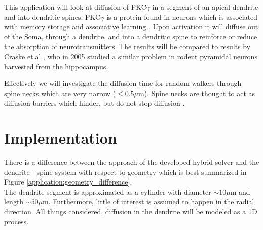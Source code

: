 \noindent This application will look at diffusion of PKC$\gamma$ in a segment of an apical dendrite and into dendritic spines. 
PKC$\gamma$ is a protein found in neurons which is associated with memory storage and associative learning \cite{saito2002protein}. 
Upon activation it will diffuse out of the Soma, through a dendrite, and into a dendritic spine to reinforce or reduce the absorption of neurotransmitters. 
The results will be compared to results by Craske et.al \cite{craske2005spines}, who in 2005 studied a similar problem in rodent pyramidal neurons harvested from the hippocampus.

Effectively we will investigate the diffusion time for random walkers through spine necks which are very narrow ($\leq0.5\mu$m). Spine necks are thought to act as diffusion barriers which hinder, but do not stop diffusion \cite{craske2005spines}.

\section{Implementation}

There is a difference between the approach of the developed hybrid solver and the dendrite - spine system with respect to geometry which is best summarized in Figure \ref{application:geometry_difference}.\\

\noindent The dendrite segment is approximated as a cylinder with diameter $\sim10\mu$m and length $\sim50\mu$m. Furthermore, little of interest is assumed to happen in the radial direction. All things considered, diffusion in the dendrite will be modeled as a 1D process. \\


